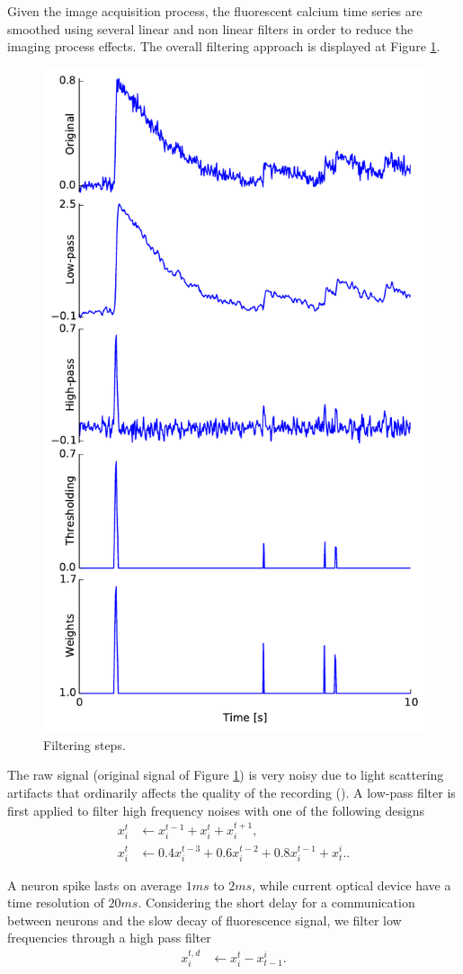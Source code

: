 \documentclass[wcp]{jmlr}
\begin{document}
Given the image acquisition process, the fluorescent calcium time series
are smoothed using several linear and non linear filters in
order to reduce the imaging process effects. The overall filtering approach
is displayed at Figure \ref{fig:filtered-signal}.

\begin{figure}[bth]
\centering
\includegraphics[width=0.4\linewidth]{images/fig_filtering}
\caption{Filtering steps.}
\label{fig:filtered-signal}
\end{figure}

The raw signal (original signal of Figure \ref{fig:filtered-signal}) is very noisy
due to light scattering artifacts that ordinarily affects the quality of the
recording (\cite{lichtman2011big}). A low-pass filter is first applied to
filter high frequency noises with one of the following designs
\begin{align}
x^t_i &\leftarrow x^{t-1}_i + x^{t}_i + x^{t+1}_i \label{eq:symetric-median}, \\
x^t_i &\leftarrow 0.4 x^{t-3}_i + 0.6 x^{t-2}_i + 0.8 x^{t-1}_i + x_{t}^i.
\label{eq:weighted-asymetric-median}.
\end{align}

A neuron spike lasts on average $1ms$ to $2ms$, while current optical
device have a time resolution of $20ms$. Considering the short delay for a
communication between neurons and the slow decay of fluorescence signal, we
filter low frequencies through a high pass filter
\begin{align}
x^{t,d}_{i} &\leftarrow x^{t}_i - x_{t-1}^i. \label{eq:high-pass-filter}
\end{align}
\end{document}
